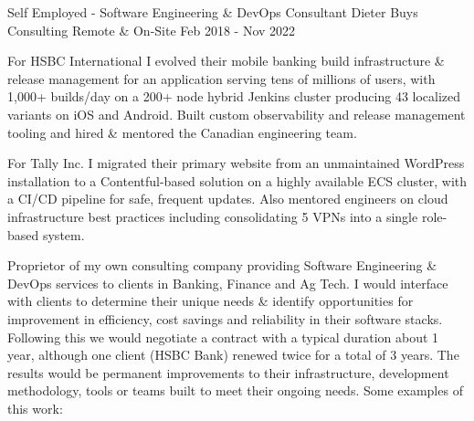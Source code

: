 \begin{cventries}
\cventrywithsummary
{Self Employed - Software Engineering \& DevOps Consultant} %
{Dieter Buys Consulting} %
{Remote \& On-Site} %
{Feb 2018 - Nov 2022} %
{
  \begin{cvitems} %
    \item {For HSBC International I evolved their mobile banking build infrastructure \& release management for an application serving tens of millions of users, with 1,000+ builds/day on a 200+ node hybrid Jenkins cluster producing 43 localized variants on iOS and Android. Built custom observability and release management tooling and hired \& mentored the Canadian engineering team.}
    \item {For Tally Inc. I migrated their primary website from an unmaintained WordPress installation to a Contentful-based solution on a highly available ECS cluster, with a CI/CD pipeline for safe, frequent updates. Also mentored engineers on cloud infrastructure best practices including consolidating 5 VPNs into a single role-based system.}
  \end{cvitems}
}
{
  Proprietor of my own consulting company providing Software Engineering \& DevOps services to clients in Banking, Finance and Ag Tech. I would interface with clients to determine their unique needs \& identify opportunities for improvement in efficiency, cost savings and reliability in their software stacks. Following this we would negotiate a contract with a typical duration about 1 year, although one client (HSBC Bank) renewed twice for a total of 3 years. The results would be permanent improvements to their infrastructure, development methodology, tools or teams built to meet their ongoing needs. Some examples of this work:
}



\end{cventries}
